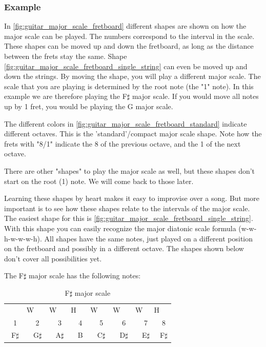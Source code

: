 \newpage

\subsubsection{Example}

In \autoref{fig:guitar_major_scale_fretboard} different shapes are shown on how the major scale can be played. The numbers correspond to the interval in the scale. These shapes can be moved up and down the fretboard, as long as the distance between the frets stay the same. Shape \autoref{fig:guitar_major_scale_fretboard_single_string} can even be moved up and down the strings. By moving the shape, you will play a different major scale. The scale that you are playing is determined by the root note (the "1" note). In this example we are therefore playing the F$\sharp$ major scale. If you would move all notes up by 1 fret, you would be playing the G major scale.

The different colors in \autoref{fig:guitar_major_scale_fretboard_standard} indicate different octaves. This is the 'standard'/compact major scale shape. Note how the frets with "8/1" indicate the 8 of the previous octave, and the 1 of the next octave.

There are other "shapes" to play the major scale as well, but these shapes don't start on the root (1) note. We will come back to those later.

Learning these shapes by heart makes it easy to improvise over a song. But more important is to see how these shapes relate to the intervals of the major scale. The easiest shape for this is \autoref{fig:guitar_major_scale_fretboard_single_string}. With this shape you can easily recognize the major diatonic scale formula (w-w-h-w-w-w-h). All shapes have the same notes, just played on a different position on the fretboard and possibly in a different octave. The shapes shown below don't cover all possibilities yet.

The F$\sharp$ major scale has the following notes:

\begin{table}[h]
	\centering
	\begin{tabular}{*{16}{c}}
		& \multicolumn{2}{P{4mm}}{\large{W}} & \multicolumn{2}{P{4mm}}{\large{W}} & \multicolumn{2}{P{4mm}}{\large{H}} & \multicolumn{2}{P{4mm}}{\large{W}} & \multicolumn{2}{P{4mm}}{\large{W}} & \multicolumn{2}{P{4mm}}{\large{W}} & \multicolumn{2}{P{4mm}}{\large{H}} & \\
		\multicolumn{2}{P{4mm}}{1} & \multicolumn{2}{P{4mm}}{2} & \multicolumn{2}{P{4mm}}{3} & \multicolumn{2}{P{4mm}}{4} & \multicolumn{2}{P{4mm}}{5} & \multicolumn{2}{P{4mm}}{6} & \multicolumn{2}{P{4mm}}{7} & \multicolumn{2}{P{4mm}}{8} \\
		\multicolumn{2}{P{4mm}}{F$\sharp$} & \multicolumn{2}{P{4mm}}{G$\sharp$} & \multicolumn{2}{P{4mm}}{A$\sharp$} & \multicolumn{2}{P{4mm}}{B} & \multicolumn{2}{P{4mm}}{C$\sharp$} & \multicolumn{2}{P{4mm}}{D$\sharp$} & \multicolumn{2}{P{4mm}}{E$\sharp$} & \multicolumn{2}{P{4mm}}{F$\sharp$}
	\end{tabular}
	\caption{F$\sharp$ major scale}
	\label{tab:guitar_f_sharp_major_scale}
\end{table}

